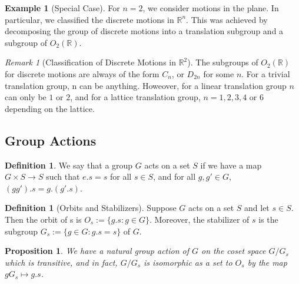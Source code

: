 \documentclass[12pt]{article}
\newtheorem{prop}[thm]{Proposition}
\theoremstyle{definition}
\newtheorem{defn}[thm]{Definition}
\newtheorem{eg}[thm]{Example}
\theoremstyle{remark}
\newtheorem{rmk}[thm]{Remark}
\numberwithin{equation}{section}
\newcommand\R{\mathbb R}    %
\begin{document}
\begin{eg}[Special Case]
        For $n =2$, we consider motions in the plane. In particular, we classified the discrete motions in $\R^n$. This was achieved by decomposing the group of discrete motions into a translation subgroup and a subgroup of $O_2(\R)$. 
\end{eg}


\vspace{15pt}

\begin{rmk}[Classification of Discrete Motions in $\R^2$]
        The subgroups of $O_2(\R)$ for discrete motions are always of the form $C_n$, or $D_{2n}$ for some $n$. For a trivial translation group, n can be anything. Howeover, for a linear translation group $n$ can only be $1$ or $2$, and for a lattice translation group, $n=1,2,3,4$ or $6$ depending on the lattice.
\end{rmk}


\vspace{15pt}


\subsection{Group Actions}

\begin{defn}
        We say that a group $G$ acts on a set $S$ if we have a map $G\times S \rightarrow S$ such that $e.s = s$ for all $s \in S$, and for all $g,g' \in G$, $(gg').s = g.(g'.s)$.
\end{defn}


\vspace{15pt}

\begin{defn}[Orbits and Stabilizers]
        Suppose $G$ acts on a set $S$ and let $s \in S$. Then the orbit of s is $O_s := \{g.s:g\in G\}$. Moreover, the stabilizer of $s$ is the subgroup $G_s := \{g \in G:g.s = s\}$ of $G$.
\end{defn}

\vspace{15pt}

\begin{prop}
        We have a natural group action of $G$ on the coset space $G/G_s$ which is transitive, and in fact, $G/G_s$ is isomorphic as a set to $O_s$ by the map $gG_s\mapsto g.s$.
\end{prop}

\vspace{15pt}
\end{document}
